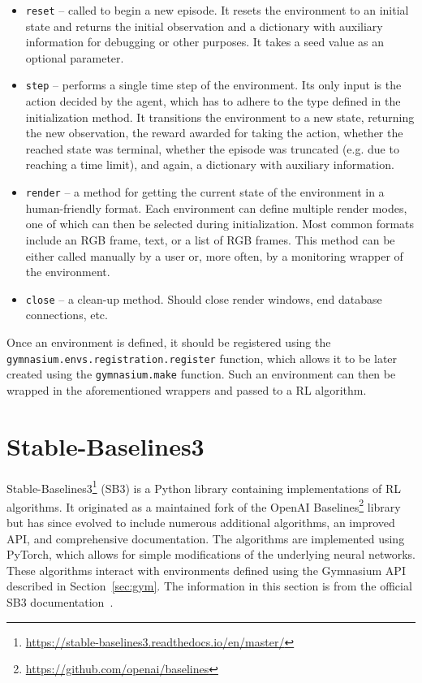 \documentclass[
  digital,     %
  oneside,     %
  nosansbold,  %
  nocolorbold, %
  lof,         %
  lot,         %
]{fithesis4}
\begin{document}
\begin{itemize}
    \item \texttt{reset} -- called to begin a new episode. It resets the environment to an initial state and returns the initial observation and a dictionary with auxiliary information for debugging or other purposes. It takes a seed value as an optional parameter.
    \item \texttt{step} -- performs a single time step of the environment. Its only input is the action decided by the agent, which has to adhere to the type defined in the initialization method. It transitions the environment to a new state, returning the new observation, the reward awarded for taking the action, whether the reached state was terminal, whether the episode was truncated (e.g. due to reaching a time limit), and again, a dictionary with auxiliary information.
    \item \texttt{render} -- a method for getting the current state of the environment in a human-friendly format. Each environment can define multiple render modes, one of which can then be selected during initialization. Most common formats include an RGB frame, text, or a list of RGB frames. This method can be either called manually by a user or, more often, by a monitoring wrapper of the environment.
    \item \texttt{close} -- a clean-up method. Should close render windows, end database connections, etc.
\end{itemize}

Once an environment is defined, it should be registered using the \texttt{gymnasium.envs.registration.register} function, which allows it to be later created using the \texttt{gymnasium.make} function. Such an environment can then be wrapped in the aforementioned wrappers and passed to a RL algorithm.

\section{Stable-Baselines3}
Stable-Baselines3\footnote{\url{https://stable-baselines3.readthedocs.io/en/master/}} (SB3) is a Python library containing implementations of RL algorithms. It originated as a maintained fork of the OpenAI Baselines\footnote{\url{https://github.com/openai/baselines}} library but has since evolved to include numerous additional algorithms, an improved API, and comprehensive documentation. The algorithms are implemented using PyTorch, which allows for simple modifications of the underlying neural networks. These algorithms interact with environments defined using the Gymnasium API described in Section~\ref{sec:gym}. The information in this section is from the official SB3 documentation~\cite{SB3-docs}.
\end{document}
